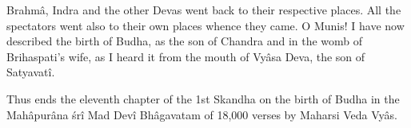 Brahm\^a, Indra and the other Devas went back to their respective places. All the spectators went also to their own places whence they came. O Munis! I have now described the birth of Budha, as the son of Chandra and in the womb of Brihaspati's wife, as I heard it from the mouth of Vy\^asa Deva, the son of Satyavat\^i.

Thus ends the eleventh chapter of the 1st Skandha on the birth of Budha in the Mah\^apur\^ana \'sr\^i Mad Dev\^i Bh\^agavatam of 18,000 verses by Maharsi Veda Vy\^as.